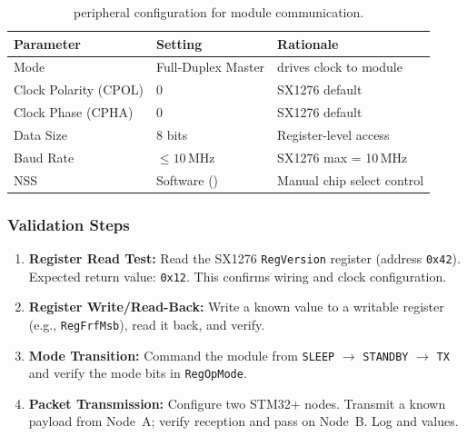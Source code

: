 \documentclass[11pt,letterpaper]{article}
\begin{document}
	\begin{table}[ht!]
		\centering
		\caption{\SPI{} peripheral configuration for \RF{} module communication.}
		\label{tab:spi}
		\renewcommand{\arraystretch}{1.3}
		\begin{tabular}{l l l}
			\toprule
			\textbf{Parameter} & \textbf{Setting} & \textbf{Rationale} \\
			\midrule
			Mode & Full-Duplex Master & \MCU{} drives clock to \RF{} module \\
			Clock Polarity (CPOL) & 0 & SX1276 default \\
			Clock Phase (CPHA) & 0 & SX1276 default \\
			Data Size & 8 bits & Register-level access \\
			Baud Rate & $\leq 10$\,MHz & SX1276 \SPI{} max = 10\,MHz \\
			NSS & Software (\GPIO{}) & Manual chip select control \\
			\bottomrule
		\end{tabular}
	\end{table}
	
	\newpage
	\subsubsection{Validation Steps}
	
	\begin{enumerate}[leftmargin=2em]
		\item \textbf{Register Read Test:} Read the SX1276 \texttt{RegVersion} register (address \texttt{0x42}). Expected return value: \texttt{0x12}. This confirms \SPI{} wiring and clock configuration.
		\item \textbf{Register Write/Read-Back:} Write a known value to a writable register (e.g., \texttt{RegFrfMsb}), read it back, and verify.
		\item \textbf{Mode Transition:} Command the module from \texttt{SLEEP} $\rightarrow$ \texttt{STANDBY} $\rightarrow$ \texttt{TX} and verify the mode bits in \texttt{RegOpMode}.
		\item \textbf{Packet Transmission:} Configure two STM32+\RF{} nodes. Transmit a known payload from Node~A; verify reception and \CRC{} pass on Node~B. Log \RSSI{} and \SNR{} values.
	\end{enumerate}
	
\end{document}
